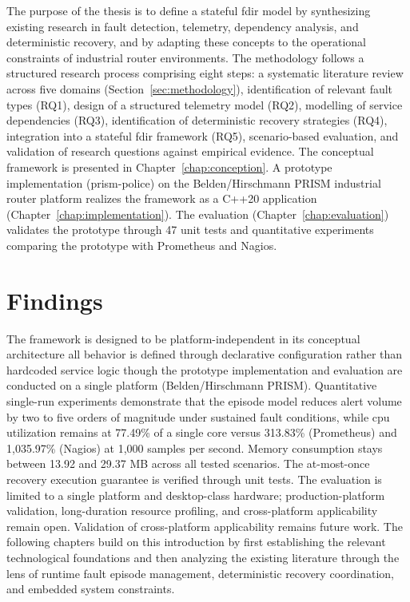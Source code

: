 The purpose of the thesis is to define a stateful \gls{fdir} model by synthesizing existing research in fault detection, telemetry, dependency analysis, and deterministic recovery, and by adapting these concepts to the operational constraints of industrial router environments. The methodology follows a structured research process comprising eight steps: a systematic literature review across five domains (Section~\ref{sec:methodology}), identification of relevant fault types (RQ1), design of a structured telemetry model (RQ2), modelling of service dependencies (RQ3), identification of deterministic recovery strategies (RQ4), integration into a stateful \gls{fdir} framework (RQ5), scenario-based evaluation, and validation of research questions against empirical evidence. The conceptual framework is presented in Chapter~\ref{chap:conception}. A prototype implementation (prism-police) on the Belden/Hirschmann PRISM industrial router platform realizes the framework as a C++20 application (Chapter~\ref{chap:implementation}). The evaluation (Chapter~\ref{chap:evaluation}) validates the prototype through 47 unit tests and quantitative experiments comparing the prototype with Prometheus and Nagios.

\section{Findings}\label{sec:intro-findings}

The framework is designed to be platform-independent in its conceptual architecture all behavior is defined through declarative configuration rather than hardcoded service logic though the prototype implementation and evaluation are conducted on a single platform (Belden/Hirschmann PRISM). Quantitative single-run experiments demonstrate that the episode model reduces alert volume by two to five orders of magnitude under sustained fault conditions, while \gls{cpu} utilization remains at 77.49\% of a single core versus 313.83\% (Prometheus) and 1,035.97\% (Nagios) at 1,000 samples per second. Memory consumption stays between 13.92 and 29.37 MB across all tested scenarios. The at-most-once recovery execution guarantee is verified through unit tests. The evaluation is limited to a single platform and desktop-class hardware; production-platform validation, long-duration resource profiling, and cross-platform applicability remain open. Validation of cross-platform applicability remains future work. The following chapters build on this introduction by first establishing the relevant technological foundations and then analyzing the existing literature through the lens of runtime fault episode management, deterministic recovery coordination, and embedded system constraints.
